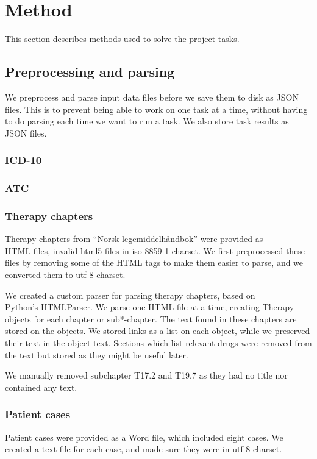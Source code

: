 \chapter{Method}
\label{cha:method}
This section describes methods used to solve the project tasks.


\section{Preprocessing and parsing}
We preprocess and parse input data files before we save them to disk as JSON
files. This is to prevent being able to work on one task at a time, without
having to do parsing each time we want to run a task. We also store task
results as JSON files.

\subsection{ICD-10}

\subsection{ATC}

\subsection{Therapy chapters}
Therapy chapters from ``Norsk legemiddelhåndbok'' were provided as\\
HTML files, invalid html5 files in iso-8859-1 charset. We first preprocessed
these files by removing some of the HTML tags to make them easier to parse,
and we converted them to utf-8 charset.

We created a custom parser for parsing therapy chapters, based on\\
Python's HTMLParser. We parse one HTML file at a time, creating Therapy
objects for each chapter or sub*-chapter. The text found in these chapters are
stored on the objects. We stored links as a list on each object, while we
preserved their text in the object text. Sections which list relevant drugs
were removed from the text but stored as they might be useful later.

We manually removed subchapter T17.2 and T19.7 as they had no title nor
contained any text.

\subsection{Patient cases}
Patient cases were provided as a Word file, which included eight cases. We
created a text file for each case, and made sure they were in utf-8 charset.


